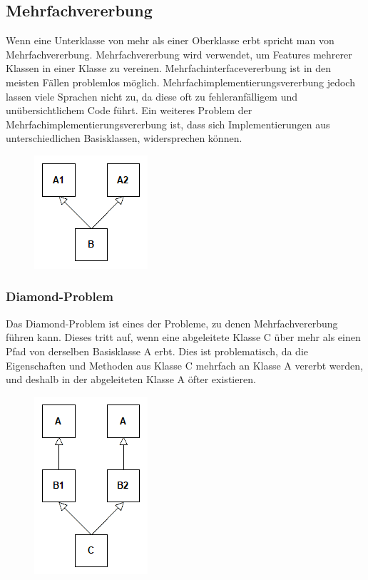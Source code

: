 	\subsection{Mehrfachvererbung}
		Wenn eine Unterklasse von mehr als einer Oberklasse erbt spricht man von Mehrfachvererbung. Mehrfachvererbung wird
		verwendet, um Features mehrerer Klassen in einer Klasse zu vereinen. Mehrfachinterfacevererbung ist in den meisten
		Fällen problemlos möglich. Mehrfachimplementierungsvererbung jedoch lassen viele Sprachen nicht zu, da diese oft zu 
		fehleranfälligem und unübersichtlichem Code führt. Ein weiteres Problem der Mehrfachimplementierungsvererbung ist, dass
		sich Implementierungen aus unterschiedlichen Basisklassen, widersprechen können.
		\begin{figure}[H]
			\includegraphics[scale=0.75]{vererbung/mehrfach/mehrfach.png}
		\end{figure}
		
		\subsubsection{Diamond-Problem}
			Das Diamond-Problem ist eines der Probleme, zu denen Mehrfachvererbung führen kann. Dieses tritt auf,
			wenn eine abgeleitete Klasse C über mehr als einen Pfad von derselben Basisklasse A erbt. Dies ist
			problematisch, da die Eigenschaften und Methoden aus Klasse C mehrfach an Klasse A vererbt werden,
			und deshalb in der abgeleiteten Klasse A öfter existieren.
			\begin{figure}[H]
				\includegraphics[scale=0.75]{vererbung/mehrfach/diamond/nicht_virtuell.png}
			\end{figure}
			
